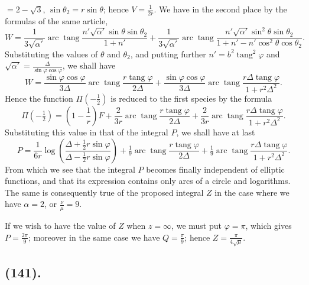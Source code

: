 \documentclass{article}
\begin{document}
$=2-\sqrt{3}$, $\sin\theta_{2}=r\sin\theta$; hence $V=\frac{1}{2r}$. We have in the second place by the formulas of the same article,
\[ W=\frac{1}{3\sqrt{\alpha'}}\operatorname{arc}\operatorname{tang}\frac{n'\sqrt{\alpha'}\sin\theta\sin\theta_{2}}{1+n'}+\frac{1}{3\sqrt{\alpha'}}\operatorname{arc}\operatorname{tang}\frac{n'\sqrt{\alpha'}\sin^{2}\theta\sin\theta_{2}}{1+n'-n'\cos^{2}\theta\cos\theta_{2}}. \]
Substituting the values of $\theta$ and $\theta_{2}$, and putting further $n'=b^{2}\operatorname{tang}^{2}\varphi$ and $\sqrt{\alpha'}=\frac{\Delta}{\sin\varphi\cos\varphi}$, we shall have
\[ W=\frac{\sin\varphi\cos\varphi}{3\Delta}\operatorname{arc}\operatorname{tang}\frac{r\operatorname{tang}\varphi}{2\Delta}+\frac{\sin\varphi\cos\varphi}{3\Delta}\operatorname{arc}\operatorname{tang}\frac{r\Delta\operatorname{tang}\varphi}{1+r^{2}\Delta^{2}}. \]
Hence the function $\Pi(-\frac{1}{2})$ is reduced to the first species by the formula
\[ \Pi(-\tfrac{1}{2})=\left(1-\frac{1}{r}\right)F+\frac{2}{3r}\operatorname{arc}\operatorname{tang}\frac{r\operatorname{tang}\varphi}{2\Delta}+\frac{2}{3r}\operatorname{arc}\operatorname{tang}\frac{r\Delta\operatorname{tang}\varphi}{1+r^{2}\Delta^{2}}. \]
Substituting this value in that of the integral $P$, we shall have at last
\[ P=\frac{1}{6r}\log\left(\frac{\Delta+\frac{1}{2}r\sin\varphi}{\Delta-\frac{1}{2}r\sin\varphi}\right)+\tfrac{1}{9}\operatorname{arc}\operatorname{tang}\frac{r\operatorname{tang}\varphi}{2\Delta}+\tfrac{1}{9}\operatorname{arc}\operatorname{tang}\frac{r\Delta\operatorname{tang}\varphi}{1+r^{2}\Delta^{2}}. \]
From which we see that the integral $P$ becomes finally independent of elliptic functions, and that its expression contains only arcs of a circle and logarithms. The same is consequently true of the proposed integral $Z$ in the case where we have $\alpha=2$, or $\frac{\nu}{\mu}=9$.

If we wish to have the value of $Z$ when $z=\infty$, we must put $\varphi=\pi$, which gives $P=\frac{2\pi}{9}$; moreover in the same case we have $Q=\frac{\pi}{9}$; hence $Z=\frac{\pi}{4\sqrt{\mu}}$.

\subsection*{(141).}
\end{document}
